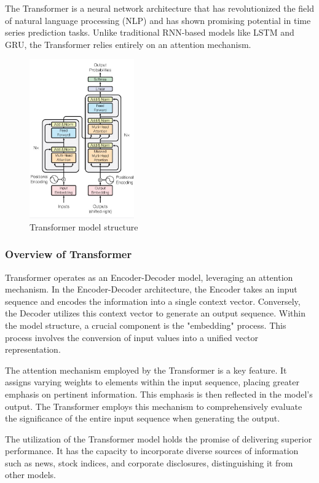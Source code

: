 The Transformer is a neural network architecture that has revolutionized the field of natural language processing (NLP) and has shown promising potential in time series prediction tasks. 
Unlike traditional RNN-based models like LSTM and GRU, the Transformer relies entirely on an attention mechanism.
\begin{figure}
	\includegraphics[width=0.4\textwidth]{Fig/Transformer.jpg}
	\caption{Transformer model structure}
\end{figure}
\subsubsection{Overview of Transformer}
Transformer operates as an Encoder-Decoder model, leveraging an attention mechanism.
In the Encoder-Decoder architecture, the Encoder takes an input sequence and encodes the information into a single context vector. 
Conversely, the Decoder utilizes this context vector to generate an output sequence.
Within the model structure, a crucial component is the "embedding" process. 
This process involves the conversion of input values into a unified vector representation.

The attention mechanism employed by the Transformer is a key feature. 
It assigns varying weights to elements within the input sequence, placing greater emphasis on pertinent information. 
This emphasis is then reflected in the model's output. 
The Transformer employs this mechanism to comprehensively evaluate the significance of the entire input sequence when generating the output.

The utilization of the Transformer model holds the promise of delivering superior performance. 
It has the capacity to incorporate diverse sources of information such as news, stock indices, and corporate disclosures, distinguishing it from other models.

